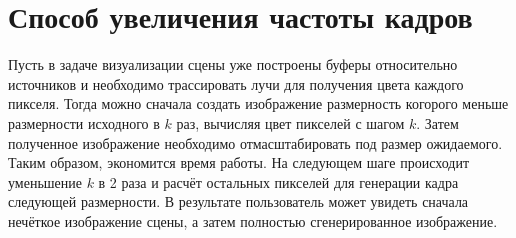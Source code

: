 \section {Способ увеличения частоты кадров} {
    Пусть в задаче визуализации сцены уже построены буферы относительно источников
    и необходимо трассировать лучи для получения цвета каждого пикселя.
    Тогда можно сначала создать изображение размерность когорого меньше размерности
    исходного в $k$ раз, вычисляя цвет пикселей с шагом $k$.
    Затем полученное изображение необходимо отмасштабировать под размер ожидаемого.
    Таким образом, экономится время работы.
    На следующем шаге происходит уменьшение $k$ в 2 раза и расчёт остальных пикселей
    для генерации кадра следующей размерности.
    В результате пользователь может увидеть сначала нечёткое изображение сцены,
    а затем полностью сгенерированное изображение.
}